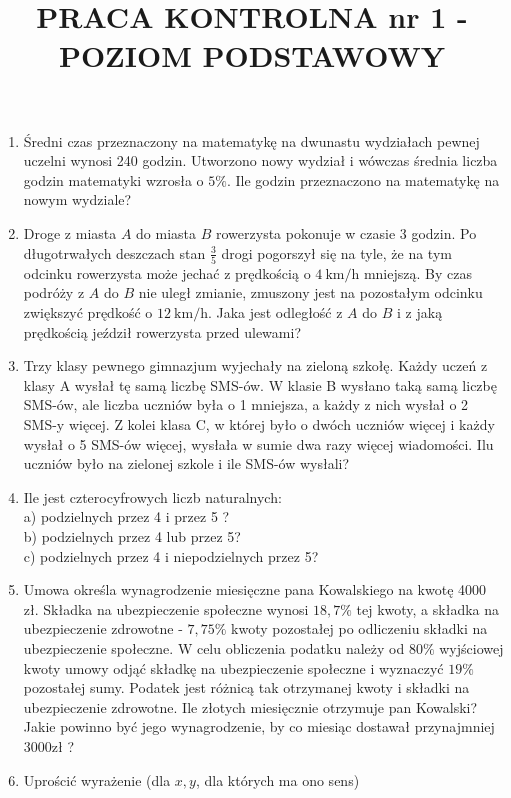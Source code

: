\documentclass[10pt]{article}
\title{PRACA KONTROLNA nr 1 - POZIOM PODSTAWOWY }
\author{}
\date{}
\begin{document}
\maketitle
\begin{enumerate}
  \item Średni czas przeznaczony na matematykę na dwunastu wydziałach pewnej uczelni wynosi 240 godzin. Utworzono nowy wydział i wówczas średnia liczba godzin matematyki wzrosła o $5 \%$. Ile godzin przeznaczono na matematykę na nowym wydziale?
  \item Droge z miasta $A$ do miasta $B$ rowerzysta pokonuje w czasie 3 godzin. Po długotrwałych deszczach stan $\frac{3}{5}$ drogi pogorszył się na tyle, że na tym odcinku rowerzysta może jechać z prędkością o $4 \mathrm{~km} / \mathrm{h}$ mniejszą. By czas podróży z $A$ do $B$ nie uległ zmianie, zmuszony jest na pozostałym odcinku zwiększyć prędkość o $12 \mathrm{~km} / \mathrm{h}$. Jaka jest odległość z $A$ do $B$ i z jaką prędkością jeździł rowerzysta przed ulewami?
  \item Trzy klasy pewnego gimnazjum wyjechały na zieloną szkołę. Każdy uczeń z klasy A wysłał tę samą liczbę SMS-ów. W klasie B wysłano taką samą liczbę SMS-ów, ale liczba uczniów była o 1 mniejsza, a każdy z nich wysłał o 2 SMS-y więcej. Z kolei klasa C, w której było o dwóch uczniów więcej i każdy wysłał o 5 SMS-ów więcej, wysłała w sumie dwa razy więcej wiadomości. Ilu uczniów było na zielonej szkole i ile SMS-ów wysłali?
  \item Ile jest czterocyfrowych liczb naturalnych:\\
a) podzielnych przez 4 i przez 5 ?\\
b) podzielnych przez 4 lub przez 5?\\
c) podzielnych przez 4 i niepodzielnych przez 5?
  \item Umowa określa wynagrodzenie miesięczne pana Kowalskiego na kwotę 4000 zł. Składka na ubezpieczenie społeczne wynosi $18,7 \%$ tej kwoty, a składka na ubezpieczenie zdrowotne - $7,75 \%$ kwoty pozostałej po odliczeniu składki na ubezpieczenie społeczne. W celu obliczenia podatku należy od $80 \%$ wyjściowej kwoty umowy odjąć składkę na ubezpieczenie społeczne i wyznaczyć $19 \%$ pozostałej sumy. Podatek jest różnicą tak otrzymanej kwoty i składki na ubezpieczenie zdrowotne. Ile złotych miesięcznie otrzymuje pan Kowalski? Jakie powinno być jego wynagrodzenie, by co miesiąc dostawał przynajmniej $3000 \mathrm{zł}$ ?
  \item Uprościć wyrażenie (dla $x, y$, dla których ma ono sens)
\end{enumerate}
\end{document}
